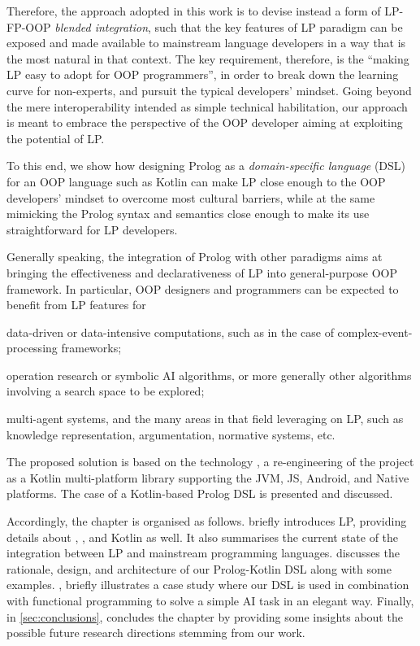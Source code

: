 \documentclass[12pt,a4paper,openright,twoside]{book}
\begin{document}
Therefore, the approach adopted in this work is to devise instead a form of LP-FP-OOP \emph{blended integration}, such that the key features of LP paradigm can be exposed and made available to mainstream language developers in a way that is the most natural in that context.
%
The key requirement, therefore, is the ``making LP easy to adopt for OOP programmers'', in order to break down the learning curve for non-experts, and pursuit the typical developers' mindset.
%
Going beyond the mere interoperability intended as simple technical habilitation, our approach is meant to embrace the perspective of the OOP developer aiming at exploiting the potential of LP.

To this end, we show how designing Prolog as a \emph{domain-specific language} (DSL) for an OOP language such as Kotlin can make LP close enough to the OOP developers' mindset to overcome most cultural barriers, while at the same mimicking the Prolog syntax and semantics close enough to make its use straightforward for LP developers.

Generally speaking, the integration of Prolog with other paradigms aims at bringing the effectiveness and declarativeness of LP into general-purpose OOP framework.
%
In particular, OOP designers and programmers can be expected to benefit from LP features for
%
\begin{inlinelist}
    \item data-driven or data-intensive computations, such as in the case of complex-event-processing frameworks;
    \item operation research or symbolic AI algorithms, or more generally other algorithms involving a search space to be explored;
    \item multi-agent systems, and the many areas in that field leveraging on LP, such as knowledge representation, argumentation, normative systems, etc.
\end{inlinelist}

The proposed solution is based on the \twopkt{} technology \cite{homepage2PKt,cco-softwarex-2021-2pkt}, a re-engineering of the \tuprolog{} project \cite{homepageTuprolog,tuprolog-padl01} as a Kotlin multi-platform library supporting the JVM, JS, Android, and Native platforms.
%
The case of a Kotlin-based Prolog DSL is presented and discussed.

Accordingly, the chapter is organised as follows.
%
 briefly introduces LP, providing details about \tuprolog{}, \twopkt{}, and Kotlin as well.
%
It also summarises the current state of the integration between LP and mainstream programming languages.
%
 discusses the rationale, design, and architecture of our Prolog-Kotlin DSL along with some examples.
%
, briefly illustrates a case study where our DSL is used in combination with functional programming to solve a simple AI task in an elegant way.
%
Finally, in \cref{sec:conclusions}, concludes the chapter by providing some insights about the possible future research directions stemming from our work.
\end{document}

